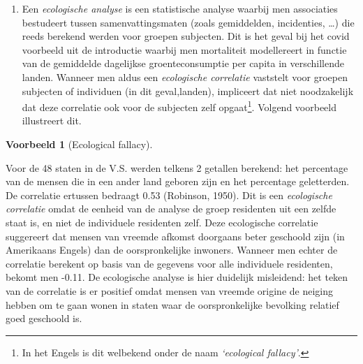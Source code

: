 \documentclass[
  12pt,dutch]{book}
\theoremstyle{definition}
\theoremstyle{definition}
\newtheorem{example}{Voorbeeld}[chapter]
\theoremstyle{definition}
\theoremstyle{definition}
\theoremstyle{remark}
\begin{document}
\begin{enumerate}
  Bij jonge kinderen is de grootte van hun schoenmaat uiteraard sterk gecorreleerd met hun leescapaciteiten. Dat op zich impliceert echter niet dat het leren van nieuwe woorden hun voeten doet groeien of dat het groeien van hun voeten impliceert dat ze beter kunnen lezen. Ook algemeen\footnote{In het Engels is dit welbekend onder de zinsnede \emph{`Association is not causation!'}.} hoeft een correlatie tussen 2 variabelen niet te impliceren dat er een causaal verband is. De relatie tussen 2 metingen kan immers sterk verstoord worden door confounders (bvb. de leeftijd in bovenstaand voorbeeld). Hoewel dit overduidelijk is in bovenstaand voorbeeld, is het in vele andere contexten veel minder duidelijk en worden er, vooral in de populaire literatuur, vaak causale beweringen gemaakt die niet (volledig) door de gegevens worden gestaafd. Volgend voorbeeld illustreert dit. Denk hierbij aan het voorbeeld van de associatie van groente consumptie en covid mortaliteit.
\item
  Een \emph{ecologische analyse} is een statistische analyse waarbij men associaties bestudeert tussen samenvattingsmaten (zoals gemiddelden, incidenties, \ldots) die reeds berekend werden voor groepen subjecten. Dit is het geval bij het covid voorbeeld uit de introductie waarbij men mortaliteit modellereert in functie van de gemiddelde dagelijkse groenteconsumptie per capita in verschillende landen. Wanneer men aldus een \emph{ecologische correlatie} vaststelt voor groepen subjecten of individuen (in dit geval,landen), impliceert dat niet noodzakelijk dat deze correlatie ook voor de subjecten zelf opgaat\footnote{In het Engels is dit welbekend onder de naam \emph{`ecological fallacy'}.}. Volgend voorbeeld illustreert dit.
\end{enumerate}

\begin{example}[Ecological fallacy]
\protect\hypertarget{exm:unnamed-chunk-126}{}\label{exm:unnamed-chunk-126}~
\end{example}

Voor de 48 staten in de V.S. werden telkens 2 getallen
berekend: het percentage van de mensen die in een ander land geboren zijn en het percentage geletterden. De correlatie ertussen bedraagt 0.53 (Robinson, 1950). Dit is een \emph{ecologische correlatie} omdat de eenheid van de analyse de groep residenten uit een zelfde staat is, en niet de individuele residenten zelf. Deze ecologische correlatie suggereert dat mensen van vreemde afkomst doorgaans beter geschoold zijn (in Amerikaans Engels) dan de oorspronkelijke inwoners. Wanneer men echter de correlatie berekent op basis
van de gegevens voor alle individuele residenten, bekomt men -0.11. De ecologische analyse is hier duidelijk misleidend: het teken van de correlatie is er positief omdat mensen van vreemde origine de neiging hebben om te gaan wonen in staten waar de oorspronkelijke bevolking relatief goed geschoold is.
\end{document}
